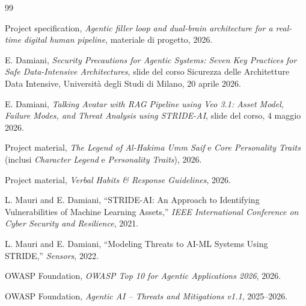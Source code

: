 \documentclass[11pt,a4paper]{article}
\begin{document}
\begin{thebibliography}{99}

Project specification, \emph{Agentic filler loop and dual-brain architecture for a real-time digital human pipeline}, materiale di progetto, 2026.

E. Damiani, \emph{Security Precautions for Agentic Systems: Seven Key Practices for Safe Data-Intensive Architectures}, slide del corso Sicurezza delle Architetture Data Intensive, Università degli Studi di Milano, 20 aprile 2026.

E. Damiani, \emph{Talking Avatar with RAG Pipeline using Veo 3.1: Asset Model, Failure Modes, and Threat Analysis using STRIDE-AI}, slide del corso, 4 maggio 2026.

Project material, \emph{The Legend of Al-Hakima Umm Saif} e \emph{Core Personality Traits} (inclusi \emph{Character Legend} e \emph{Personality Traits}), 2026.

Project material, \emph{Verbal Habits \& Response Guidelines}, 2026.

L. Mauri and E. Damiani, ``STRIDE-AI: An Approach to Identifying Vulnerabilities of Machine Learning Assets,'' \emph{IEEE International Conference on Cyber Security and Resilience}, 2021.

L. Mauri and E. Damiani, ``Modeling Threats to AI-ML Systems Using STRIDE,'' \emph{Sensors}, 2022.

OWASP Foundation, \emph{OWASP Top 10 for Agentic Applications 2026}, 2026.







 OWASP Foundation, \textit{Agentic AI -- Threats and Mitigations v1.1}, 2025--2026.

\end{thebibliography}
\end{document}
